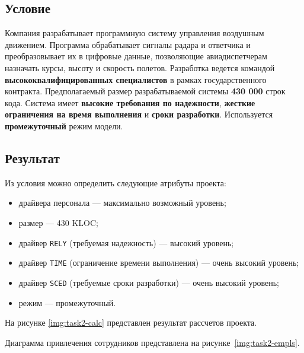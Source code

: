 \subsection{Условие}

Компания разрабатывает программную систему управления воздушным движением.
Программа обрабатывает сигналы радара и ответчика и преобразовывает их в
цифровые данные, позволяющие авиадиспетчерам назначать курсы, высоту и скорость
полетов. Разработка ведется командой \textbf{высококвалифицированных
специалистов} в рамках государственного контракта. Предполагаемый размер
разрабатываемой системы \textbf{430 000} строк кода. Система имеет
\textbf{высокие требования по надежности}, \textbf{жесткие ограничения на время
выполнения} и \textbf{сроки разработки}. Используется \textbf{промежуточный}
режим модели.


\subsection{Результат}

Из условия можно определить следующие атрибуты проекта:

\begin{itemize}
    \item драйвера персонала --- максимально возможный уровень;
    \item размер --- 430 KLOC;
    \item драйвер \texttt{RELY} (требуемая надежность) --- высокий уровень;
    \item драйвер \texttt{TIME} (ограничение времени выполнения) --- очень высокий уровень;
    \item драйвер \texttt{SCED} (требуемые сроки разработки) --- очень высокий уровень;
    \item режим --- промежуточный.
\end{itemize}

На рисунке \ref{img:task2-calc} представлен результат рассчетов проекта.


Диаграмма привлечения сотрудников представлена на рисунке~\ref{img:task2-empls}.


